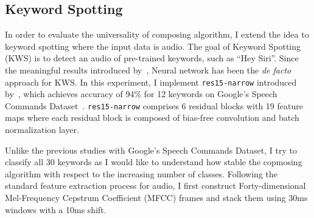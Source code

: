 \documentclass{article}
\begin{document}
\begin{table}[t]
    \centering
    \small
    \caption{Accuracy of fine-tuned model per each class}
    \label{table:mnist_fine_tuned}
\end{table}

\subsection{Keyword Spotting}

In order to evaluate the universality of composing algorithm, I extend the idea to keyword spotting where the input data is audio. The goal of Keyword Spotting (KWS) is to detect an audio of pre-trained keywords, such as “Hey Siri”. Since the meaningful results introduced by~\cite{sainath2015convolutional}, Neural network has been the {\it de facto} approach for KWS. In this experiment, I implement \texttt{res15-narrow} introduced by~\cite{tang2018deep}, which achieves accuracy of 94\% for 12 keywords on Google’s Speech Commands Dataset~\cite{speechcommandsdataset}. \texttt{res15-narrow} comprises 6 residual blocks with 19 feature maps where each residual block is composed of bias-free convolution and batch normalization layer.

Unlike the previous studies with Google’s Speech Commands Dataset, I try to classify all 30 keywords as I would like to understand how stable the copmosing algorithm with respect to the increasing number of classes. Following the standard feature extraction process for audio, I first construct Forty-dimensional Mel-Frequency Cepstrum Coefficient (MFCC) frames and stack them using 30ms windows with a 10ms shift.
\end{document}

